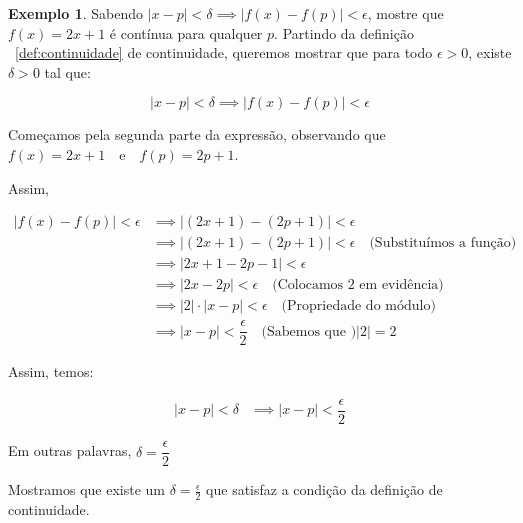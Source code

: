 \documentclass[12pt,openright,twoside,a4paper]{article}
\theoremstyle{definition}
\newtheorem{example}{Exemplo}[section]
\begin{document}
	\begin{example}Sabendo $| x - p |  < \delta \implies |f(x) - f(p) | < \epsilon$, mostre que $f(x) = 2x+1$ é contínua para qualquer $p$.
		Partindo da definição ~\ref{def:continuidade} de continuidade, queremos mostrar que para todo $\epsilon > 0$, existe $\delta > 0$ tal que:
		
		
		
		\[
		|x - p| < \delta \implies |f(x) - f(p)| < \epsilon
		\]
		
		Começamos pela segunda parte da expressão, observando que $f(x) = 2x + 1 \quad \text{e} \quad f(p) = 2p + 1$.
		
		
		
		Assim, 
		
		\begin{align*}
			|f(x) - f(p)| < \epsilon &\implies |(2x + 1) - (2p + 1)| < \epsilon\\
			&\implies |(2x + 1) - (2p + 1)| < \epsilon \quad \text{(Substituímos a função)}\\
			&\implies |2x + 1 - 2p - 1| < \epsilon \\
			&\implies |2x - 2p| < \epsilon \quad \text{(Colocamos 2 em evidência)}\\
			&\implies |2| \cdot |x - p| < \epsilon \quad \text{(Propriedade do módulo)}\\
			&\implies |x - p| < \dfrac{\epsilon}{2} \quad \text{(Sabemos que )} |2| = 2
		\end{align*}
		
		Assim, temos:
		
		\begin{align*}
			|x - p| < \delta &\implies |x - p| < \dfrac{\epsilon}{2}
		\end{align*}
		
		
		Em outras palavras, $\delta = \dfrac{\epsilon}{2}$
		
		
		Mostramos que existe um $\delta = \frac{\epsilon}{2}$ que satisfaz a condição da definição de continuidade.
		

\end{example}
\end{document}
